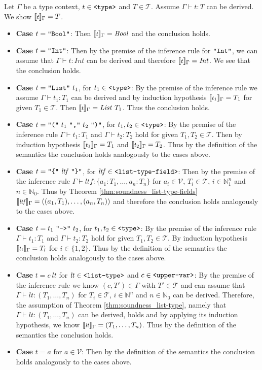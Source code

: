 \documentclass[]{scrbook}
\newcommand{\mf}[1]{\text{\texttt{#1}}}
\newcommand{\semantic}[1]{\llbracket \text{\footnotesize\texttt{#1}} \rrbracket}
\theoremstyle{definition}
\theoremstyle{definition}
\theoremstyle{definition}
\theoremstyle{remark}
\begin{document}
Let \(\Gamma\) be a type context, \(t \in\mf{<type>}\) and
\(T\in\mathcal{T}\). Assume \(\Gamma\vdash t:T\) can be derived. We show
\(\semantic{$t$}_\Gamma = T\).

\begin{itemize}
\item\textbf{Case} $t = \mf{"Bool"}$: Then \(\semantic{$t$}_\Gamma=\mathit{Bool}\) and the conclusion holds.
\item\textbf{Case} $t = \mf{"Int"}$: Then by the premise of the inference rule for $\mf{"Int"}$, we can assume that  $\Gamma\vdash t:\mathit{Int}$ can be derived and therefore \(\semantic{$t$}_\Gamma=\mathit{Int}\). We see that the conclusion holds.
\item\textbf{Case} $t = \mf{"List"} \ t_1$, for $t_1\in\mf{<type>}$: By the premise of the inference rule we assume $\Gamma\vdash t_1:T_1$ can be derived and by induction hypothesis \(\semantic{$t_1$}_\Gamma = T_1\) for given $T_1\in\mathcal{T}$. Then \(\semantic{$t$}_\Gamma=\mathit{List} \ T_1\). Thus the conclusion holds.
\item\textbf{Case} $t = \mf{"("} \ t_1 \ \mf{","}\  t_2 \ \mf{")"}$, for $t_1,t_2\in\mf{<type>}$: By the premise of the inference rule $\Gamma\vdash t_1:T_1$ and $\Gamma\vdash t_2:T_2$ hold for given $T_1,T_2\in\mathcal{T}$. Then by induction hypothesis \(\semantic{$t_1$}_\Gamma = T_1\) and \(\semantic{$t_2$}_\Gamma = T_2\). Thus by the definition of the semantics the conclusion holds analogously to the cases above.
\item\textbf{Case} $t = \mf{"\{"} \ \mathit{ltf} \ \mf{"\}"}$, for $\mathit{ltf}\in\mf{<list-type-field>}$:
  Then by the premise of the inference rule $\Gamma\vdash \mathit{ltf}:\{a_1:T_1,\dots,a_n:T_n\}$ for $a_i\in\mathcal{V}$, $T_i\in\mathcal{T}$, $i\in\mathbb{N}_1^n$ and $n\in\mathbb{N}_0$. Thus by Theorem \ref{thm:soundness_list-type-fields} \(\semantic{$\mathit{ltf}$}_\Gamma = ((a_1,T_1),\dots,(a_n,T_n))\) and therefore the conclusion holds  analogously to the cases above.
\item\textbf{Case} $t = t_1 \ \mf{"->"} \ t_2$, for $t_1,t_2\in\mf{<type>}$: By the premise of the inference rule $\Gamma\vdash t_1:T_1$ and $\Gamma\vdash t_2:T_2$ hold for given $T_1,T_2\in\mathcal{T}$. By induction hypothesis \(\semantic{$t_i$}_\Gamma = T_i\) for $i\in\{1,2\}$. Thus by the definition of the semantics the conclusion holds  analogously to the cases above.
\item\textbf{Case} $t = c \ \mathit{lt}$ for $\mathit{lt}\in\mf{<list-type>}$ and $c\in\mf{<upper-var>}$: By the premise of the inference rule we know $(c,T')\in\Gamma$ with $T'\in\mathcal{T}$ and can assume that $\Gamma\vdash \mathit{lt}:(T_1,\dots,T_n)$ for $T_i\in\mathcal{T}$, $i\in\mathbb{N}^n$ and $n\in\mathbb{N}_0$ can be derived. Therefore, the assumption of Theorem \ref{thm:soundness_list-type}, namely that $\Gamma\vdash \mathit{lt}:(T_1,\dots,T_n)$ can be derived, holds and by applying its induction hypothesis, we know \(\semantic{$\mathit{lt}$}_\Gamma=(T_1,\dots,T_n)\). Thus by the definition of the semantics the conclusion holds.
\item\textbf{Case} $t = a$ for $a\in\mathcal{V}$: Then by the definition of the semantics the conclusion holds analogously to the cases above.
\end{itemize}
\end{document}

